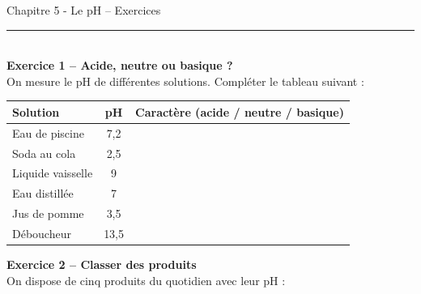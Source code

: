 \documentclass[11pt,a4paper]{article}
\begin{document}
\begin{center}
 \LARGE{Chapitre 5 - Le pH -- Exercices}
\end{center}

\normalsize

\hrule\
\\[0,2cm]

\textbf{Exercice 1 -- Acide, neutre ou basique ?} \\

On mesure le pH de différentes solutions. Compléter le tableau suivant :

\vspace{3mm}

\begin{center}
\begin{tabular}{|l|c|c|}
\hline
\textbf{Solution} & \textbf{pH} & \textbf{Caractère (acide / neutre / basique)} \\
\hline
Eau de piscine & 7,2 & \\
\hline
Soda au cola & 2,5 & \\
\hline
Liquide vaisselle & 9 & \\
\hline
Eau distillée & 7 & \\
\hline
Jus de pomme & 3,5 & \\
\hline
Déboucheur & 13,5 & \\
\hline
\end{tabular}
\end{center}

\textbf{Exercice 2 -- Classer des produits} \\[1mm]

On dispose de cinq produits du quotidien avec leur pH :

\vspace{1mm}
\end{document}

